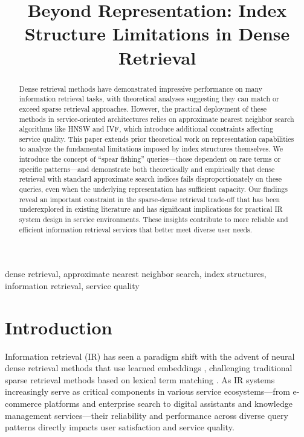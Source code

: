 \documentclass[conference,anonymous]{IEEEtran}
\begin{document}
\title{Beyond Representation: Index Structure Limitations in Dense Retrieval}

\author{
}

\maketitle

\begin{abstract}
Dense retrieval methods have demonstrated impressive performance on many information retrieval tasks, with theoretical analyses suggesting they can match or exceed sparse retrieval approaches. However, the practical deployment of these methods in service-oriented architectures relies on approximate nearest neighbor search algorithms like HNSW and IVF, which introduce additional constraints affecting service quality. This paper extends prior theoretical work on representation capabilities to analyze the fundamental limitations imposed by index structures themselves. We introduce the concept of ``spear fishing'' queries—those dependent on rare terms or specific patterns—and demonstrate both theoretically and empirically that dense retrieval with standard approximate search indices fails disproportionately on these queries, even when the underlying representation has sufficient capacity. Our findings reveal an important constraint in the sparse-dense retrieval trade-off that has been underexplored in existing literature and has significant implications for practical IR system design in service environments. These insights contribute to more reliable and efficient information retrieval services that better meet diverse user needs.
\end{abstract}

\begin{IEEEkeywords}
dense retrieval, approximate nearest neighbor search, index structures, information retrieval, service quality
\end{IEEEkeywords}

\section{Introduction}
Information retrieval (IR) has seen a paradigm shift with the advent of neural dense retrieval methods that use learned embeddings \cite{ma2022survey}, challenging traditional sparse retrieval methods based on lexical term matching \cite{karpukhin2020dense, xiong2021approximate}. As IR systems increasingly serve as critical components in various service ecosystems—from e-commerce platforms and enterprise search to digital assistants and knowledge management services—their reliability and performance across diverse query patterns directly impacts user satisfaction and service quality.
\end{document}
